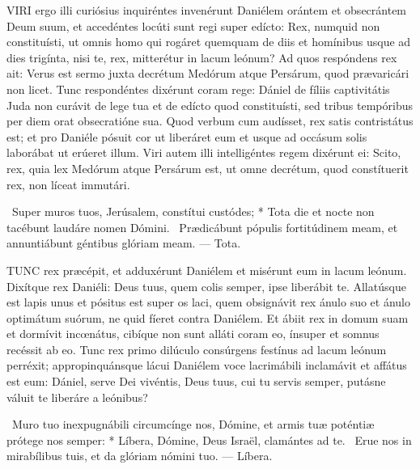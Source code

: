


\lettrine[lines=2]{V}{IRI} ergo illi curiósius inquiréntes invenérunt Daniélem orántem et obsecrántem Deum suum, et accedéntes locúti sunt regi super edícto: Rex, numquid non constituísti, ut omnis homo qui rogáret quemquam de diis et homínibus usque ad dies trigínta, nisi te, rex, mitterétur in lacum leónum? Ad quos respóndens rex ait: Verus est sermo juxta decrétum Medórum atque Persárum, quod prævaricári non licet. Tunc respondéntes dixérunt coram rege: Dániel de fíliis captivitátis Juda non curávit de lege tua et de edícto quod constituísti, sed tribus tempóribus per diem orat obsecratióne sua. Quod verbum cum audísset, rex satis contristátus est; et pro Daniéle pósuit cor ut liberáret eum et usque ad occásum solis laborábat ut erúeret illum. Viri autem illi intelligéntes regem dixérunt ei: Scito, rex, quia lex Medórum atque Persárum est, ut omne decrétum, quod constítuerit rex, non líceat immutári.

\R\ Super muros tuos, Jerúsalem, constítui custódes; * Tota die et nocte non tacébunt laudáre nomen Dómini. \V\ Prædicábunt pópulis fortitúdinem meam, et annuntiábunt géntibus glóriam meam. — Tota.


\lettrine[lines=2]{T}{UNC} rex præcépit, et adduxérunt Daniélem et misérunt eum in lacum leónum. Dixítque rex Daniéli: Deus tuus, quem colis semper, ipse liberábit te. Allatúsque est lapis unus et pósitus est super os laci, quem obsignávit rex ánulo suo et ánulo optimátum suórum, ne quid fíeret contra Daniélem. Et ábiit rex in domum suam et dormívit incœnátus, cibíque non sunt alláti coram eo, ínsuper et somnus recéssit ab eo. Tunc rex primo dilúculo consúrgens festínus ad lacum leónum perréxit; appropinquánsque lácui Daniélem voce lacrimábili inclamávit et affátus est eum: Dániel, serve Dei vivéntis, Deus tuus, cui tu servis semper, putásne váluit te liberáre a leónibus?

\R\ Muro tuo inexpugnábili circumcínge nos, Dómine, et armis tuæ poténtiæ prótege nos semper: * Líbera, Dómine, Deus Israël, clamántes ad te. \V\ Erue nos in mirabílibus tuis, et da glóriam nómini tuo. — Líbera.


